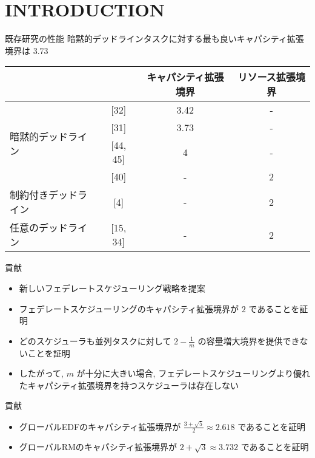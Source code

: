 
\section{INTRODUCTION}
\label{sec: introduction}

\begin{frame}{既存研究の性能}
    暗黙的デッドラインタスクに対する最も良いキャパシティ拡張境界は $3.73$
    \begin{table}[]
        \begin{tabular}{|l|c|c|c|}
            \hline
                                                & \multicolumn{1}{l|}{} & キャパシティ拡張境界 & リソース拡張境界 \\ \hline
            \multirow{4}{*}{暗黙的デッドライン} & {[}32{]}              & 3.42                 & -                \\ \cline{2-4}
                                                & {[}31{]}              & 3.73                 & -                \\ \cline{2-4}
                                                & {[}44, 45{]}          & 4                    & -                \\ \cline{2-4}
                                                & {[}40{]}              & -                    & 2                \\ \hline
            制約付きデッドライン                & {[}4{]}               & -                    & 2                \\ \hline
            任意のデッドライン                  & {[}15, 34{]}          & -                    & 2                \\ \hline
        \end{tabular}
    \end{table}
\end{frame}

\begin{frame}{貢献}
    \begin{itemize}
        \item 新しいフェデレートスケジューリング戦略を提案
        \item フェデレートスケジューリングのキャパシティ拡張境界が $2$ であることを証明
        \item どのスケジューラも並列タスクに対して $2 - \frac{1}{m}$ の容量増大境界を提供できないことを証明
        \item したがって, $m$ が十分に大きい場合, フェデレートスケジューリングより優れたキャパシティ拡張境界を持つスケジューラは存在しない
    \end{itemize}
\end{frame}

\begin{frame}{貢献}
    \begin{itemize}
        \item グローバルEDFのキャパシティ拡張境界が $\frac{3+\sqrt{5}}{2} \approx 2.618$ であることを証明
        \item グローバルRMのキャパシティ拡張境界が $2+\sqrt{3} \approx 3.732$ であることを証明
    \end{itemize}
\end{frame}

